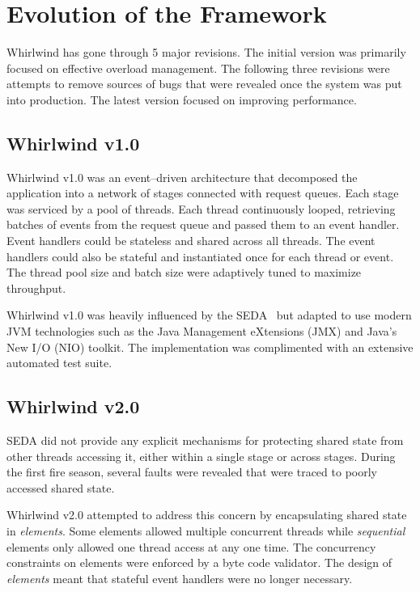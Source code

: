 \documentclass[conference]{IEEEtran}
\begin{document}
\section{Evolution of the Framework}

Whirlwind has gone through 5 major revisions. The initial version was primarily focused on effective overload management. The following three revisions were attempts to remove sources of bugs that were revealed once the system was put into production. The latest version focused on improving performance.

\subsection{Whirlwind v1.0}

Whirlwind v1.0 was an event--driven architecture that decomposed the application into a network of stages connected with request queues. Each stage was serviced by a pool of threads. Each thread continuously looped, retrieving batches of events from the request queue and passed them to an event handler. Event handlers could be stateless and shared across all threads. The event handlers could also be stateful and instantiated once for each thread or event. The thread pool size and batch size were adaptively tuned to maximize throughput. 

Whirlwind v1.0 was heavily influenced by the SEDA~\cite{welsh03Adaptive} but adapted to use modern JVM technologies such as the Java Management eXtensions (JMX) and Java's New I/O (NIO) toolkit. The implementation was complimented with an extensive automated test suite. 

\subsection{Whirlwind v2.0}

SEDA did not provide any explicit mechanisms for protecting shared state from other threads accessing it, either within a single stage or across stages. During the first fire season, several faults were revealed that were traced to poorly accessed shared state.

Whirlwind v2.0 attempted to address this concern by encapsulating shared state in \emph{elements}. Some elements allowed multiple concurrent threads while \emph{sequential} elements only allowed one thread access at any one time. The concurrency constraints on elements were enforced by a byte code validator. The design of \emph{elements} meant that stateful event handlers were no longer necessary.
\end{document}
